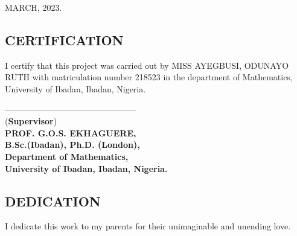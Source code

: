 \documentclass[a4 paper, 12pt]{report}
\theoremstyle{plain}
\begin{document}
\begin{center}
	MARCH, 2023.
\end{center}
\newpage
\begin{center}
	\section*{CERTIFICATION} 
\end{center}
I certify that this project was carried out by  MISS AYEGBUSI, ODUNAYO RUTH with matriculation number 218523 in the department of Mathematics, University of Ibadan, Ibadan, Nigeria.\\
\begin{center}
	-----------------------------------------------\\
	(\textbf{Supervisor})\\
	\textbf{PROF. G.O.S. EKHAGUERE,}\\
	\textbf{B.Sc.(Ibadan), Ph.D. (London),}\\
	\textbf{Department of Mathematics,}\\
	\textbf{University of Ibadan, Ibadan, Nigeria.} 
\end{center}

\newpage
\begin{center}
	\section*{DEDICATION}
\end{center}
\noindent
\par I dedicate this work to my parents for their unimaginable and unending love.

\end{document}
